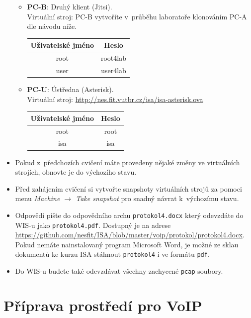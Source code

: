 \begin{itemize}
\begin{itemize}
	\item \textbf{PC-B}: Druhý klient (Jitsi).\\
	Virtuální stroj: PC-B vytvoříte v~průběhu laboratoře klonováním PC-A dle návodu níže.
	\begin{table}[H]
		\centering
		\begin{tabular}{|c|c|}
		\hline
		\textbf{Uživatelské jméno} & \textbf{Heslo} \\ \hline
		root                       & root4lab       \\ \hline
		user                       & user4lab       \\ \hline
		\end{tabular}
	\end{table}
	\item \textbf{PC-U}: Ústředna (Asterisk).\\
	Virtuální stroj: \url{http://nes.fit.vutbr.cz/isa/isa-asterisk.ova}
	\begin{table}[H]
		\centering
		\begin{tabular}{|c|c|}
		\hline
		\textbf{Uživatelské jméno} & \textbf{Heslo} \\ \hline
		root                       & root       \\ \hline
		isa                       & isa       \\ \hline
		\end{tabular}
	\end{table}
  \end{itemize}
  \item Pokud z~předchozích cvičení máte provedeny nějaké změny ve virtuálních strojích, obnovte je do výchozího stavu.
  \item Před zahájením cvičení si vytvořte snapshoty virtuálních strojů za pomoci
  menu \textit{Machine $\rightarrow$ Take snapshot} pro snadný návrat k~výchozímu stavu.
  \item Odpovědi pište do odpovědního archu \texttt{protokol4.docx} který odevzdáte do WIS-u jako \texttt{protokol4.pdf}.
  Dostupný je na adrese \url{https://github.com/nesfit/ISA/blob/master/voip/protokol/protokol4.docx}.
  Pokud nemáte nainstalovaný program Microsoft Word, je možné ze sklau dokumentů ke kurzu ISA stáhnout \texttt{protokol4} i ve formátu \texttt{pdf}.
  \item Do WIS-u budete také odevzdávat všechny zachycené \texttt{pcap} soubory.
\end{itemize}


\section{Příprava prostředí pro VoIP}

